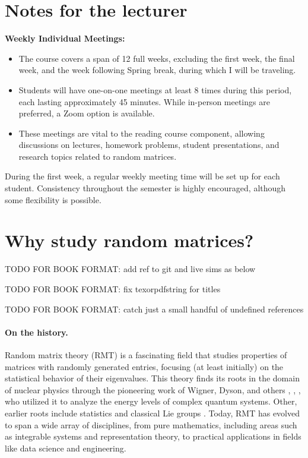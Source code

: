 \documentclass[letterpaper,11pt,oneside,reqno]{book}
\numberwithin{equation}{chapter}  %
\theoremstyle{definition}
\newenvironment{lnotes}{\section*{Notes for the lecturer}}{}
\begin{document}
\begin{lnotes}
\textbf{Weekly Individual Meetings:}
\begin{itemize}
				\item The course covers a span of 12 full weeks, excluding the first week, the final week, and the week following Spring break, during which I will be traveling.
				\item Students will have one-on-one meetings at least 8 times during this period, each lasting approximately 45 minutes. While in-person meetings are preferred, a Zoom option is available.
				\item These meetings are vital to the reading course component, allowing discussions on lectures, homework problems, student presentations, and research topics related to random matrices.
\end{itemize}
During the first week, a regular weekly meeting time will be set up for each student. Consistency throughout the semester is highly encouraged, although some flexibility is possible.
\end{lnotes}


\section{Why study random matrices?}

TODO FOR BOOK FORMAT: add ref to git and live sims as below

TODO FOR BOOK FORMAT: fix texorpdfstring for titles

TODO FOR BOOK FORMAT: catch just a small handful of undefined references

\paragraph{On the history.}
Random matrix theory (RMT) is a fascinating field that
studies
properties of matrices with randomly generated entries,
focusing (at least initially)
on the statistical behavior of their eigenvalues.
This theory finds its roots in the domain of nuclear
physics through the pioneering work of Wigner, Dyson, and
others \cite{wigner1955characteristic},
\cite{dyson1962brownian},
\cite{Dyson1962_III}, who utilized it to analyze the energy levels of complex quantum systems.
Other, earlier roots include statistics \cite{dixon1905generalization}
and classical Lie groups \cite{Hurwitz1897}.
Today, RMT has evolved to span a wide array of disciplines,
from pure mathematics, including areas such as integrable
systems and representation theory, to practical applications
in fields like data science and engineering.
\end{document}
